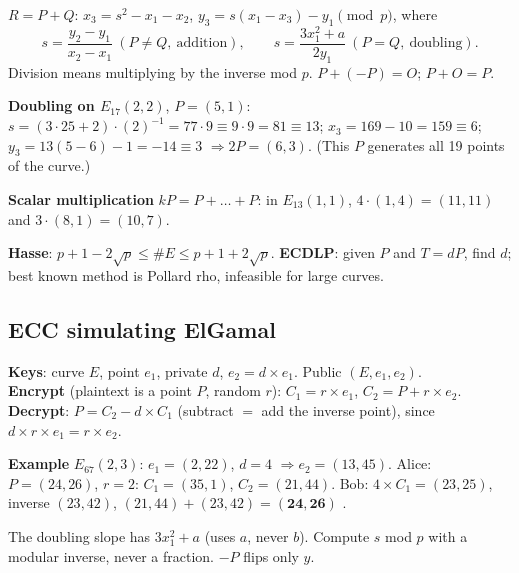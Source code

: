 \begin{keybox}[title=Point addition and doubling]
$R = P + Q$: \quad $x_3 = s^2 - x_1 - x_2$, \quad $y_3 = s(x_1 - x_3) - y_1 \pmod p$, where
\[
s = \frac{y_2 - y_1}{x_2 - x_1}\ (P \ne Q,\ \text{addition}),\qquad s = \frac{3x_1^2 + a}{2y_1}\ (P = Q,\ \text{doubling}).
\]
Division means multiplying by the inverse mod $p$. $P + (-P) = O$; $P + O = P$.
\end{keybox}
\textbf{Doubling on $E_{17}(2, 2)$}, $P = (5, 1)$: $s = (3 \cdot 25 + 2) \cdot (2)^{-1} = 77 \cdot 9 \equiv 9 \cdot 9 = 81 \equiv 13$; \;$x_3 = 169 - 10 = 159 \equiv 6$; \;$y_3 = 13(5 - 6) - 1 = -14 \equiv 3$ $\Rightarrow 2P = (6, 3)$. (This $P$ generates all 19 points of the curve.)

\textbf{Scalar multiplication} $kP = P + \dots + P$: in $E_{13}(1,1)$, $4 \cdot (1, 4) = (11, 11)$ and $3 \cdot (8, 1) = (10, 7)$.

\textbf{Hasse}: $p + 1 - 2\sqrt p \le \#E \le p + 1 + 2\sqrt p$. \textbf{ECDLP}: given $P$ and $T = dP$, find $d$; best known method is Pollard rho, infeasible for large curves.

\subsection{ECC simulating ElGamal}
\begin{keybox}
\textbf{Keys}: curve $E$, point $e_1$, private $d$, \;$e_2 = d \times e_1$. Public $(E, e_1, e_2)$.\\
\textbf{Encrypt} (plaintext is a point $P$, random $r$): $C_1 = r \times e_1$, \;$C_2 = P + r \times e_2$.\\
\textbf{Decrypt}: $P = C_2 - d \times C_1$ \;(subtract $=$ add the inverse point), since $d \times r \times e_1 = r \times e_2$.
\end{keybox}
\textbf{Example} $E_{67}(2, 3)$: $e_1 = (2, 22)$, $d = 4$ $\Rightarrow e_2 = (13, 45)$. Alice: $P = (24, 26)$, $r = 2$: $C_1 = (35, 1)$, $C_2 = (21, 44)$. Bob: $4 \times C_1 = (23, 25)$, inverse $(23, 42)$, $(21, 44) + (23, 42) = \mathbf{(24, 26)}$ \checkmark.

\begin{trap}
The doubling slope has $3x_1^2 + a$ (uses $a$, never $b$). Compute $s$ mod $p$ with a modular inverse, never a fraction. $-P$ flips only $y$.
\end{trap}
